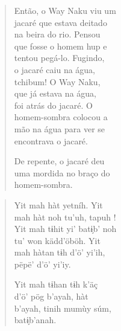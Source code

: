\begin{verse}
Então, o Way Naku viu um\\
jacaré que estava deitado\\
na beira do rio. Pensou\\
que fosse o homem hup e\\
tentou pegá-lo. Fugindo,\\
o jacaré caiu na água,\\
tchibum! O Way Naku,\\
que já estava na água,\\
foi atrás do jacaré. O\\
homem-sombra colocou a\\
mão na água para ver se\\
encontrava o jacaré.

De repente, o jacaré deu\\
uma mordida no braço do\\
homem-sombra.
\end{verse}

\begin{verse}
Yit mah hàt yetníh. Yit\\
mah hàt noh tu’uh, tapuh !\\
Yit mah tɨhit yi’ batɨ̗b’ noh\\
tu’ won kädd’öböh. Yit\\
mah hàtan tɨh d’ö’ yi’ih,\\
pëpë’ d’ö’ yi’iy.

Yit mah tɨhan tɨh k’äç\\
d’ö’ pög b’ayah, hàt\\
b’ayah, tinih mumùy súm,\\
batɨ̗b’anah.
\end{verse}

\vspace*{\fill}


